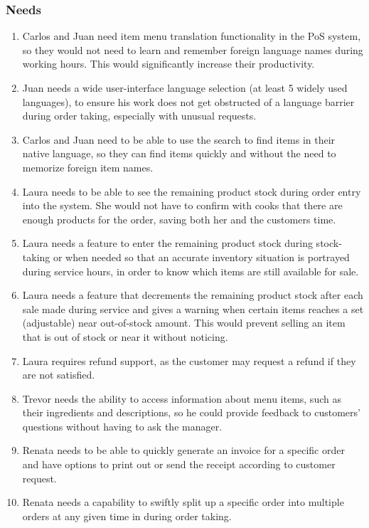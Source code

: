 \documentclass{article}
\begin{document}
\subsubsection{Needs}
\label{N1-10}
\begin{enumerate}[label=N\arabic*.]
    \item Carlos and Juan need item menu translation functionality in the PoS system, so they would not need to learn and remember foreign language names during  working hours. This would significantly increase their productivity.
    \item Juan needs a wide user-interface language selection (at least 5 widely used languages), to ensure his work does not get obstructed of a language barrier during order taking, especially with unusual requests.
    \item Carlos and Juan need to be able to use the search to find items in their native language, so they can find items quickly and without the need to memorize foreign item names.
    \item Laura needs to be able to see the remaining product stock during order entry into the system. She would not have to confirm with cooks that there are enough products for the order, saving both her and the customers time.
    \item Laura needs a feature to enter the remaining product stock during stock-taking or when needed so that an accurate inventory situation is portrayed during service hours, in order to know which items are still available for sale.
    \item Laura needs a feature that decrements the remaining product stock after each sale made during service and gives a warning when certain items reaches a set (adjustable) near out-of-stock amount. This would prevent selling an item that is out of stock or near it without noticing.
    \item Laura requires refund support, as the customer may request a refund if they are not satisfied.
    \item Trevor needs the ability to access information about menu items, such as their ingredients and descriptions, so he could provide feedback to customers' questions without having to ask the manager.
    \item Renata needs to be able to quickly generate an invoice for a specific order and have options to print out or send the receipt according to customer request.
    \item Renata needs a capability to swiftly split up a specific order into multiple orders at any given time in during order taking.
\end{enumerate}
\end{document}

